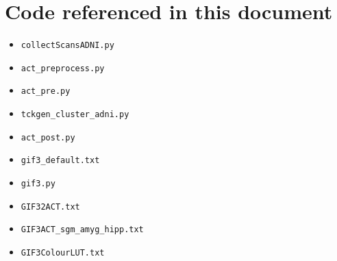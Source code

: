 \documentclass[12pt]{elsarticle}
\begin{document}
%
%
%
%
%
%
%
%


\newpage
\appendix
\section*{Code referenced in this document}
\begin{itemize}
	\item \verb|collectScansADNI.py|
	\item \verb|act_preprocess.py|
	\item \verb|act_pre.py|
	\item \verb|tckgen_cluster_adni.py|
	\item \verb|act_post.py|
	\item \verb|gif3_default.txt|
	\item \verb|gif3.py|
	\item \verb|GIF32ACT.txt|
	\item \verb|GIF3ACT_sgm_amyg_hipp.txt|
	\item \verb|GIF3ColourLUT.txt|
\end{itemize}
\end{document}
